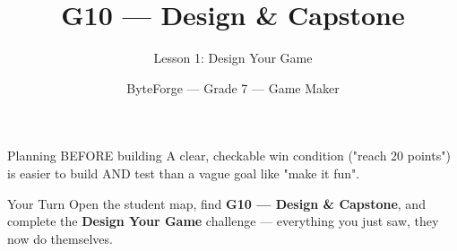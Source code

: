 \documentclass[aspectratio=169]{beamer}
\title{G10 — Design \& Capstone}
\subtitle{Lesson 1: Design Your Game}
\author{ByteForge --- Grade 7 --- Game Maker}
\date{}
\begin{document}
\begin{frame}
    \titlepage
\end{frame}

\begin{frame}{Planning BEFORE building}
    \Large
    A clear, checkable win condition ("reach 20 points") is easier to build AND test than a vague goal like "make it fun".
\end{frame}

\begin{frame}{Your Turn}
    \Large
    Open the student map, find \textbf{G10 — Design \& Capstone}, and complete
    the \textbf{Design Your Game} challenge --- everything you just saw, they now do themselves.
\end{frame}
\end{document}
